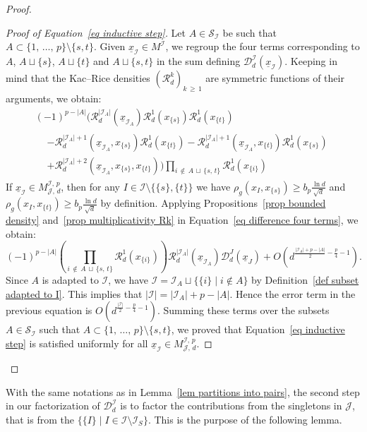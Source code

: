 \documentclass[10pt]{amsart}
\theoremstyle{definition}\newtheorem{defi}[theo]{Definition}\newtheorem{rema}[theo]{Remark}\newtheorem{exam}[theo]{Example}\newtheorem{exem}[theo]{Example}\newtheorem{nota}[theo]{Notation}
\newcommand{\D}{\mathcal{D}}
\newcommand{\I}{\mathcal{I}}
\newcommand{\J}{\mathcal{J}}
\newcommand{\clR}{\mathcal{R}}
\newcommand{\clS}{\mathcal{S}}
\newcommand{\norm}[1]{\left\lvert #1 \right\rvert}
\renewcommand{\geq}{\geqslant}
\begin{document}
\begin{proof}
\begin{proof}[{Proof of Equation~\eqref{eq inductive step}}]
Let $A \in \clS_\I$ be such that $A \subset \{1,\,\dots,\,p\} \setminus \{s,t\}$. Given $\underline{x}_\I \in M^\I$, we regroup the four terms corresponding to $A$, $A \sqcup \{s\}$, $A \sqcup \{t\}$ and $A \sqcup \{s,t\}$ in the sum defining $\D_d^\I(\underline{x}_\I)$. Keeping in mind that the Kac--Rice densities $(\clR_d^k)_{k\,\geq\,1}$ are symmetric functions of their arguments, we obtain:
\begin{multline}\label{eq difference four terms}
(-1)^{p-\norm{A}} \bigg(\clR_d^{\norm{\I_A}}\left(\underline{x}_{\I_A}\right)\clR^1_d\left(x_{\{s\}}\right)\clR^1_d\left(x_{\{t\}}\right)\\
\begin{aligned}
&- \clR_d^{\norm{\I_A}+1}\left(\underline{x}_{\I_A},x_{\{s\}}\right)\clR^1_d\left(x_{\{t\}}\right)
- \clR_d^{\norm{\I_A}+1}\left(\underline{x}_{\I_A},x_{\{t\}}\right)\clR^1_d\left(x_{\{s\}}\right)\\
& + \clR_d^{\norm{\I_A}+2}\left(\underline{x}_{\I_A},x_{\{s\}},x_{\{t\}}\right) \bigg) \prod_{i\,\notin\,A\,\sqcup\,\{s,\,t\}} \clR^1_d\left(x_{\{i\}}\right)
\end{aligned}
\end{multline}
If $\underline{x}_\I \in M^{\I,\,p}_{\J,\,d}$, then for any $I \in \I \setminus \{\{s\},\{t\}\}$ we have $\rho_g(x_I,x_{\{s\}}) \geq b_p\tfrac{\ln d}{\sqrt{d}}$ and $\rho_g(x_I,x_{\{t\}}) \geq b_p\tfrac{\ln d}{\sqrt{d}}$ by definition. Applying Propositions~\ref{prop bounded density} and~\ref{prop multiplicativity Rk} in Equation~\eqref{eq difference four terms}, we obtain:
\[
(-1)^{p-\norm{A}} \left(\prod_{i\,\notin\,A\,\sqcup\,\{s,\,t\}} \clR^1_d\left(x_{\{i\}}\right)\right)\clR_d^{\norm{\I_A}}\left(\underline{x}_{\I_A}\right) \D_d^J\left(\underline{x}_J\right)+O\!\left(d^{\frac{\norm{\I_A}+p-\norm{A}}{2}-\frac{p}{4}-1}\right).
\]
Since $A$ is adapted to $\I$, we have $\I = \I_A \sqcup \{\{i\} \mid i \notin A\}$ by Definition~\ref{def subset adapted to I}. This implies that $|\I| =|\I_A| +p - |A|$. Hence the error term in the previous equation is $O(d^{\frac{|\I|}{2}-\frac{p}{4}-1})$. Summing these terms over the subsets $A \in \clS_\I$ such that $A \subset \{1,\,\dots,\,p\} \setminus \{s,t\}$, we proved that Equation~\eqref{eq inductive step} is satisfied uniformly for all $\underline{x}_\I \in M^{\I,\,p}_{\J,\,d}$.
\end{proof}\let\qed\relax
\end{proof}

With the same notations as in Lemma~\ref{lem partitions into pairs}, the second step in our factorization of $\D^\I_d$ is to factor the contributions from the singletons in $\J$, that is from the $\{\{I\} \mid I \in \I \setminus \I_S\}$. This is the purpose of the following lemma.
\end{document}
